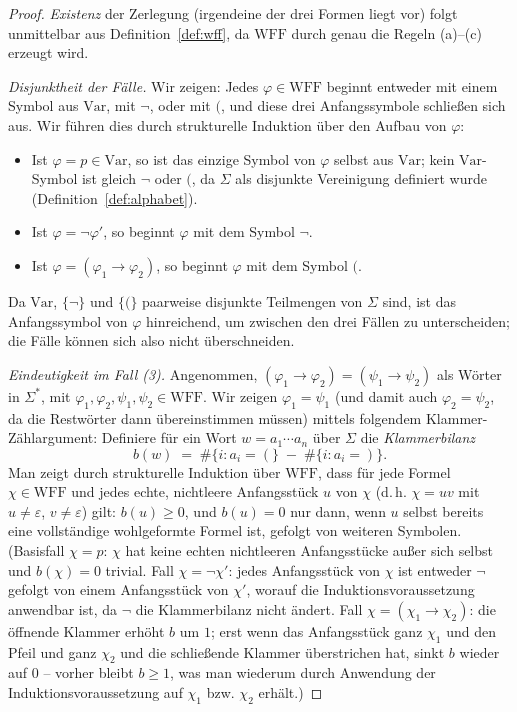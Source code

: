 \documentclass[12pt, a4paper]{article}
\theoremstyle{definition}
\theoremstyle{remark}
\newcommand{\WFF}{\mathrm{WFF}}
\newcommand{\Var}{\mathrm{Var}}
\begin{document}
\begin{proof}
\emph{Existenz} der Zerlegung (irgendeine der drei Formen liegt vor) folgt unmittelbar aus Definition~\ref{def:wff}, da $\WFF$ durch genau die Regeln (a)--(c) erzeugt wird.

\emph{Disjunktheit der Fälle.} Wir zeigen: Jedes $\varphi \in \WFF$ beginnt entweder mit einem Symbol aus $\Var$, mit $\neg$, oder mit $($, und diese drei Anfangssymbole schließen sich aus. Wir führen dies durch strukturelle Induktion über den Aufbau von $\varphi$:
\begin{itemize}
  \item Ist $\varphi = p \in \Var$, so ist das einzige Symbol von $\varphi$ selbst aus $\Var$; kein $\Var$-Symbol ist gleich $\neg$ oder $($, da $\Sigma$ als disjunkte Vereinigung definiert wurde (Definition~\ref{def:alphabet}).
  \item Ist $\varphi = \neg\varphi'$, so beginnt $\varphi$ mit dem Symbol $\neg$.
  \item Ist $\varphi = (\varphi_1 \to \varphi_2)$, so beginnt $\varphi$ mit dem Symbol $($.
\end{itemize}
Da $\Var$, $\{\neg\}$ und $\{(\}$ paarweise disjunkte Teilmengen von $\Sigma$ sind, ist das Anfangssymbol von $\varphi$ hinreichend, um zwischen den drei Fällen zu unterscheiden; die Fälle können sich also nicht überschneiden.

\emph{Eindeutigkeit im Fall (3).} Angenommen, $(\varphi_1 \to \varphi_2) = (\psi_1 \to \psi_2)$ als Wörter in $\Sigma^\ast$, mit $\varphi_1, \varphi_2, \psi_1, \psi_2 \in \WFF$. Wir zeigen $\varphi_1 = \psi_1$ (und damit auch $\varphi_2 = \psi_2$, da die Restwörter dann übereinstimmen müssen) mittels folgendem Klammer-Zählargument: Definiere für ein Wort $w = a_1 \cdots a_n$ über $\Sigma$ die \emph{Klammerbilanz}
\[
  b(w) \;=\; \#\{i : a_i = (\} \;-\; \#\{i : a_i = )\}.
\]
Man zeigt durch strukturelle Induktion über $\WFF$, dass für jede Formel $\chi \in \WFF$ und jedes echte, nichtleere Anfangsstück $u$ von $\chi$ (d.\,h. $\chi = uv$ mit $u \ne \varepsilon$, $v \ne \varepsilon$) gilt: $b(u) \geq 0$, und $b(u) = 0$ nur dann, wenn $u$ selbst bereits eine vollständige wohlgeformte Formel ist, gefolgt von weiteren Symbolen. (Basisfall $\chi = p$: $\chi$ hat keine echten nichtleeren Anfangsstücke außer sich selbst und $b(\chi)=0$ trivial. Fall $\chi=\neg\chi'$: jedes Anfangsstück von $\chi$ ist entweder $\neg$ gefolgt von einem Anfangsstück von $\chi'$, worauf die Induktionsvoraussetzung anwendbar ist, da $\neg$ die Klammerbilanz nicht ändert. Fall $\chi=(\chi_1\to\chi_2)$: die öffnende Klammer erhöht $b$ um $1$; erst wenn das Anfangsstück ganz $\chi_1$ und den Pfeil und ganz $\chi_2$ und die schließende Klammer überstrichen hat, sinkt $b$ wieder auf $0$ -- vorher bleibt $b \ge 1$, was man wiederum durch Anwendung der Induktionsvoraussetzung auf $\chi_1$ bzw. $\chi_2$ erhält.)


\end{proof}
\end{document}
